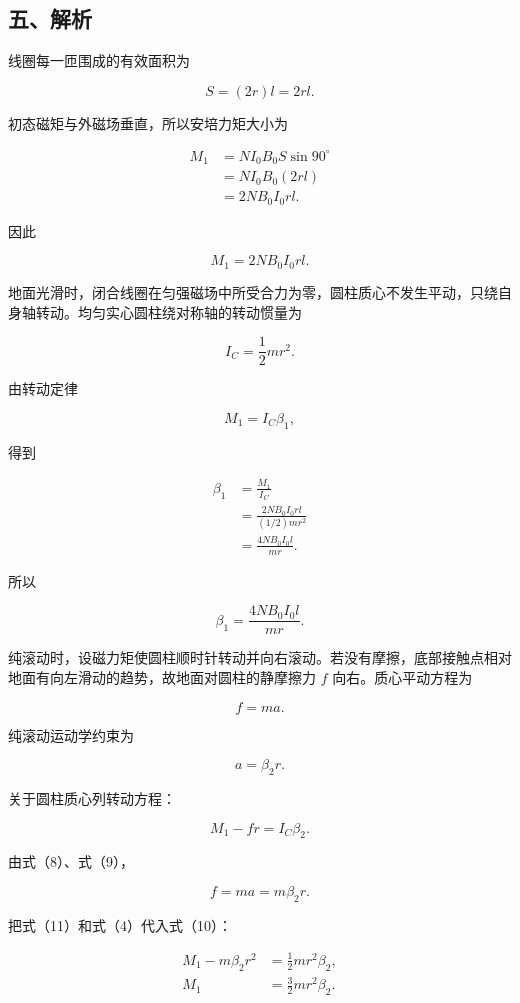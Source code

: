 \documentclass[12pt,a4paper,UTF8]{ctexart}
\begin{document}
\subsection{五、解析}\label{ux4e94ux89e3ux6790-4}

线圈每一匝围成的有效面积为

\[
S=(2r)l=2rl. \tag{1}
\]

初态磁矩与外磁场垂直，所以安培力矩大小为

\[
\begin{aligned}
M_1
&=NI_0B_0S\sin90^\circ\\
&=NI_0B_0(2rl)\\
&=2NB_0I_0rl.
\end{aligned} \tag{2}
\]

因此

\[
\boxed{M_1=2NB_0I_0rl}. \tag{3}
\]

地面光滑时，闭合线圈在匀强磁场中所受合力为零，圆柱质心不发生平动，只绕自身轴转动。均匀实心圆柱绕对称轴的转动惯量为

\[
I_C=\frac12mr^2. \tag{4}
\]

由转动定律

\[
M_1=I_C\beta_1, \tag{5}
\]

得到

\[
\begin{aligned}
\beta_1
&=\frac{M_1}{I_C}\\
&=\frac{2NB_0I_0rl}{(1/2)mr^2}\\
&=\frac{4NB_0I_0l}{mr}.
\end{aligned} \tag{6}
\]

所以

\[
\boxed{\beta_1=\frac{4NB_0I_0l}{mr}}. \tag{7}
\]

纯滚动时，设磁力矩使圆柱顺时针转动并向右滚动。若没有摩擦，底部接触点相对地面有向左滑动的趋势，故地面对圆柱的静摩擦力
\(f\) 向右。质心平动方程为

\[
f=ma. \tag{8}
\]

纯滚动运动学约束为

\[
a=\beta_2r. \tag{9}
\]

关于圆柱质心列转动方程：

\[
M_1-fr=I_C\beta_2. \tag{10}
\]

由式（8）、式（9），

\[
f=ma=m\beta_2r. \tag{11}
\]

把式（11）和式（4）代入式（10）：

\[
\begin{aligned}
M_1-m\beta_2r^2
&=\frac12mr^2\beta_2,\\
M_1
&=\frac32mr^2\beta_2.
\end{aligned} \tag{12}
\]
\end{document}
